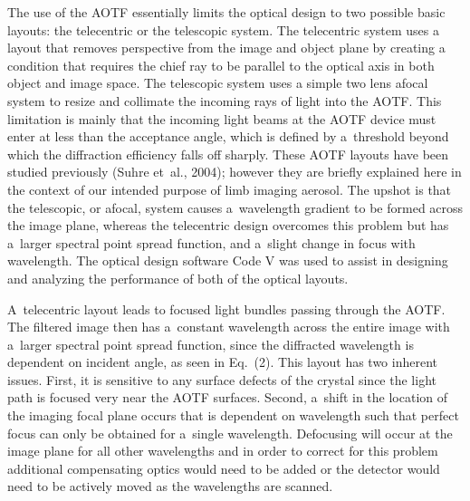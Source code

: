 \documentclass[amtd, online, hvmath]{copernicus}
\begin{document}
The use of the AOTF essentially limits the optical design to two
possible basic layouts: the telecentric or the telescopic system. The telecentric system uses a layout that removes perspective from the image and object plane by creating a condition that requires the chief ray to be parallel to the optical axis in both object and image space. The telescopic system uses a simple two lens afocal system to resize and collimate the incoming rays of light into the AOTF. This
limitation is mainly that the incoming light beams at the AOTF device
must enter at less than the acceptance angle, which is defined by
a~threshold beyond which the diffraction efficiency falls off
sharply. These AOTF layouts have been studied previously (Suhre
et~al., 2004); however they are briefly explained here in the context
of our intended purpose of limb imaging aerosol. The upshot is that
the telescopic, or afocal, system causes a~wavelength gradient to be
formed across the image plane, whereas the telecentric design
overcomes this problem but has a~larger spectral point spread
function, and a~slight change in focus with wavelength. The optical
design software Code V was used to assist in designing and analyzing
the performance of both of the optical layouts.

A~telecentric layout leads to focused light bundles passing through
the AOTF. The filtered image then has a~constant wavelength across the
entire image with a~larger spectral point spread function, since the
diffracted wavelength is dependent on incident angle, as seen in
Eq.~(2). This layout has two inherent issues. First, it is sensitive
to any surface defects of the crystal since the light path is focused
very near the AOTF surfaces. Second, a~shift in the location of the
imaging focal plane occurs that is dependent on wavelength such that
perfect focus can only be obtained for a~single wavelength. Defocusing
will occur at the image plane for all other wavelengths and in order
to correct for this problem additional compensating optics would need
to be added or the detector would need to be actively moved as the
wavelengths are scanned.
\end{document}
